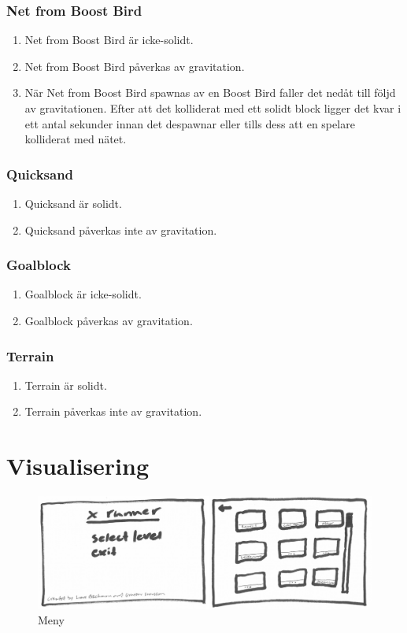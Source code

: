 \documentclass{TDP003mall}
\begin{document}
\subsubsection{Net from Boost Bird}
\begin{enumerate}
\item Net from Boost Bird är icke-solidt.
\item Net from Boost Bird påverkas av gravitation.
\item När Net from Boost Bird spawnas av en Boost Bird faller det nedåt till följd av gravitationen. Efter att det kolliderat med ett solidt block ligger det kvar i ett antal sekunder innan det despawnar eller tills dess att en spelare kolliderat med nätet.
\end{enumerate}

\subsubsection{Quicksand}
\begin{enumerate}
\item Quicksand är solidt.
\item Quicksand påverkas inte av gravitation.
\end{enumerate}

\subsubsection{Goalblock}
\begin{enumerate}
\item Goalblock är icke-solidt.
\item Goalblock påverkas av gravitation.
\end{enumerate}

\subsubsection{Terrain}
\begin{enumerate}
\item Terrain är solidt.
\item Terrain påverkas inte av gravitation.
\end{enumerate}

\section{Visualisering}
\begin{figure}[!h]
  \centering
  \includegraphics[scale=0.20]{startmeny}
  \caption{Meny}
  \label{Meny}
\end{figure}
\end{document}
